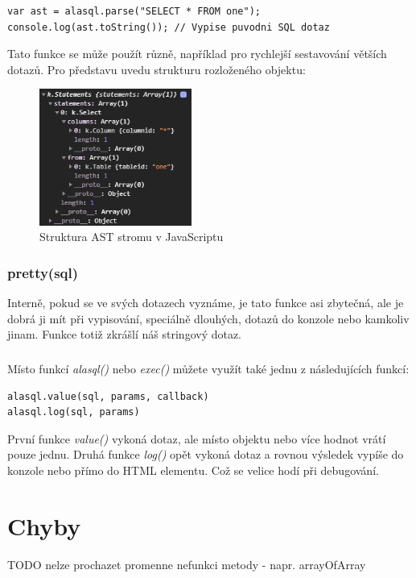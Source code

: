 \documentclass[a4, titlepage]{article}
\begin{document}
\begin{lstlisting}
var ast = alasql.parse("SELECT * FROM one");
console.log(ast.toString()); // Vypise puvodni SQL dotaz
\end{lstlisting}
Tato funkce se může použít různě, například pro rychlejší sestavování větších dotazů. Pro představu uvedu strukturu rozloženého objektu:
\begin{figure}[h]
    \centering
    \includegraphics[width=5cm]{astObj}
    \caption{Struktura AST stromu v JavaScriptu}
\end{figure} 

\subsubsection*{pretty(sql)}
Interně, pokud se ve svých dotazech vyznáme, je tato funkce asi zbytečná, ale je dobrá ji mít při vypisování, speciálně dlouhých, dotazů do konzole nebo kamkoliv jinam. Funkce totiž zkrášlí náš stringový dotaz.

\subsubsection*{}
Místo funkcí \textit{alasql()} nebo \textit{exec()} můžete využít také jednu z následujících funkcí:

\begin{lstlisting}
alasql.value(sql, params, callback)
alasql.log(sql, params)
\end{lstlisting}

První funkce \textit{value()} vykoná dotaz, ale místo objektu nebo více hodnot vrátí pouze jednu. Druhá funkce \textit{log()} opět vykoná dotaz a rovnou výsledek vypíše do konzole nebo přímo do HTML elementu. Což se velice hodí při debugování.


\section{Chyby}
TODO
nelze prochazet promenne
nefunkci metody - napr. arrayOfArray
\end{document}
